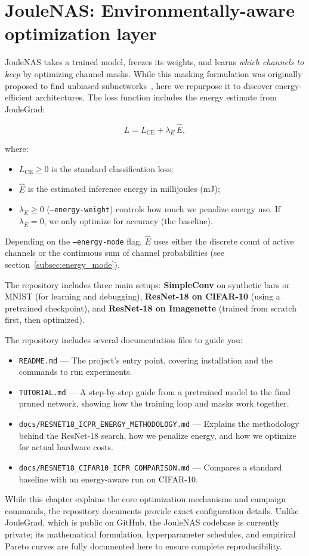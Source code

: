 \chapter{JouleNAS: Environmentally-aware optimization layer}

JouleNAS takes a trained model, freezes its weights, and learns \emph{which channels to keep} by optimizing channel masks. While this masking formulation was originally proposed to find unbiased subnetworks~\cite{de2026bias}, here we repurpose it to discover energy-efficient architectures. The loss function includes the energy estimate
from JouleGrad:

$$
L = L_{\text{CE}} + \lambda_E\,\widehat{E},
$$

where:
\begin{itemize}
    \item $L_{\text{CE}} \ge 0$ is the standard classification loss;
    \item $\widehat{E}$ is the estimated inference energy in millijoules (mJ);
    \item $\lambda_E \ge 0$ (\texttt{--energy-weight}) controls how much we penalize energy use. If $\lambda_E = 0$, we only optimize for accuracy (the baseline).
\end{itemize}

Depending on the \texttt{--energy-mode} flag, $\widehat{E}$ uses either
the discrete count of active channels or the continuous
sum of channel probabilities (see section~\ref{subsec:energy_mode}).

The repository includes three main setups:
\textbf{SimpleConv} on synthetic bars or MNIST (for learning and debugging),
\textbf{ResNet-18 on CIFAR-10} (using a pretrained checkpoint), and
\textbf{ResNet-18 on Imagenette} (trained from scratch first, then optimized).

The repository includes several documentation files to guide you:
\begin{itemize}
    \item \texttt{README.md} --- The project's entry point, covering installation and the commands to run experiments.
    \item \texttt{TUTORIAL.md} --- A step-by-step guide from a pretrained model to the final pruned network, showing how the training loop and masks work together.
    \item \texttt{docs/RESNET18\_ICPR\_ENERGY\_METHODOLOGY.md}
    --- Explains the methodology behind the ResNet-18 search, how we penalize energy, and how we optimize for actual hardware costs.
    \item \texttt{docs/RESNET18\_CIFAR10\_ICPR\_COMPARISON.md}
    --- Compares a standard baseline with an energy-aware run on CIFAR-10.
\end{itemize}
While this chapter explains the core optimization mechanisms and campaign commands, the repository documents provide exact configuration details. Unlike JouleGrad, which is public on GitHub, the JouleNAS codebase is currently private; its mathematical formulation, hyperparameter schedules, and empirical Pareto curves are fully documented here to ensure complete reproducibility.

